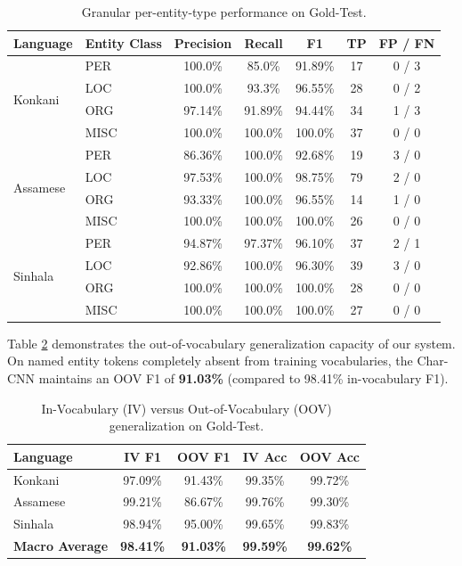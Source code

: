 \documentclass[default,iicol]{sn-jnl}
\begin{document}
\begin{table}[h]
\caption{Granular per-entity-type performance on Gold-Test.}\label{tab6}
\centering
\begin{tabular}{llccccc}
\toprule
Language & Entity Class & Precision & Recall & F1 & TP & FP / FN \\
\midrule
\multirow{4}{*}{Konkani} & PER & 100.0\% & 85.0\% & 91.89\% & 17 & 0 / 3 \\
 & LOC & 100.0\% & 93.3\% & 96.55\% & 28 & 0 / 2 \\
 & ORG & 97.14\% & 91.89\% & 94.44\% & 34 & 1 / 3 \\
 & MISC & 100.0\% & 100.0\% & 100.0\% & 37 & 0 / 0 \\
\midrule
\multirow{4}{*}{Assamese} & PER & 86.36\% & 100.0\% & 92.68\% & 19 & 3 / 0 \\
 & LOC & 97.53\% & 100.0\% & 98.75\% & 79 & 2 / 0 \\
 & ORG & 93.33\% & 100.0\% & 96.55\% & 14 & 1 / 0 \\
 & MISC & 100.0\% & 100.0\% & 100.0\% & 26 & 0 / 0 \\
\midrule
\multirow{4}{*}{Sinhala} & PER & 94.87\% & 97.37\% & 96.10\% & 37 & 2 / 1 \\
 & LOC & 92.86\% & 100.0\% & 96.30\% & 39 & 3 / 0 \\
 & ORG & 100.0\% & 100.0\% & 100.0\% & 28 & 0 / 0 \\
 & MISC & 100.0\% & 100.0\% & 100.0\% & 27 & 0 / 0 \\
\bottomrule
\end{tabular}
\end{table}

Table \ref{tab7} demonstrates the out-of-vocabulary generalization capacity of our system. On named entity tokens completely absent from training vocabularies, the Char-CNN maintains an OOV F1 of \textbf{91.03\%} (compared to 98.41\% in-vocabulary F1).

\begin{table}[h]
\caption{In-Vocabulary (IV) versus Out-of-Vocabulary (OOV) generalization on Gold-Test.}\label{tab7}
\centering
\begin{tabular}{lcccc}
\toprule
Language & IV F1 & OOV F1 & IV Acc & OOV Acc \\
\midrule
Konkani & 97.09\% & 91.43\% & 99.35\% & 99.72\% \\
Assamese & 99.21\% & 86.67\% & 99.76\% & 99.30\% \\
Sinhala & 98.94\% & 95.00\% & 99.65\% & 99.83\% \\
\midrule
\textbf{Macro Average} & \textbf{98.41\%} & \textbf{91.03\%} & \textbf{99.59\%} & \textbf{99.62\%} \\
\bottomrule
\end{tabular}
\end{table}
\end{document}
